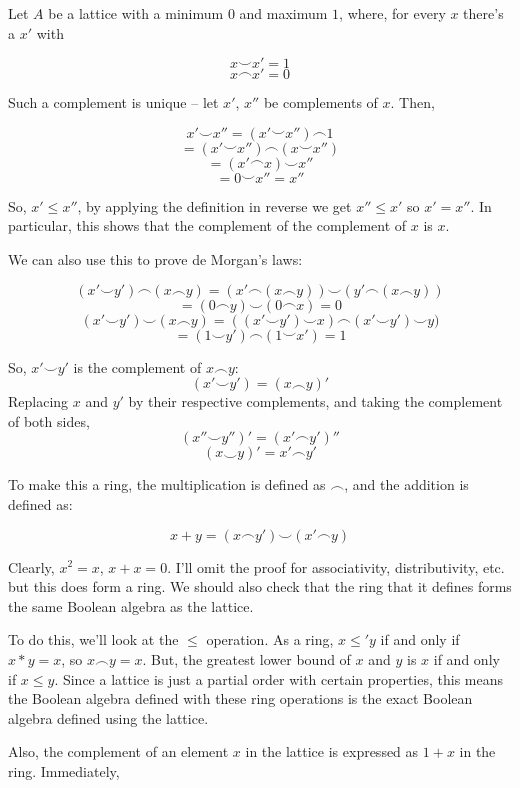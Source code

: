 \documentclass{article}
\begin{document}
      Let $A$ be a lattice with a minimum $0$ and maximum $1$, where, for every
      $x$ there's a $x'$ with

      \[x \smile x' = 1\] \[x \frown x' = 0\]

      Such a complement is unique -- let $x'$, $x''$ be complements of $x$. Then,

      \[x' \smile x'' = (x' \smile  x'') \frown 1\] \[= (x' \smile  x'') \frown (x
      \smile x'')\] \[= (x' \frown x) \smile x''\] \[= 0 \smile x'' = x''\]

      So, $x' \leq x''$, by applying the definition in reverse we get $x'' \leq
      x'$ so $x' = x''$. In particular, this shows that the complement of the
      complement of $x$ is $x$.

      We can also use this to prove de Morgan's laws:

      \[(x' \smile y') \frown (x \frown y) = (x' \frown (x \frown y)) \smile (y'
      \frown (x \frown y))\] \[ = (0 \frown y) \smile (0 \frown x) = 0\]
      \[(x' \smile y') \smile (x \frown y) = ((x' \smile y') \smile x) \frown (x'
      \smile y') \smile y)\] \[ = (1 \smile y') \frown (1 \smile x') = 1\]

      So, $x' \smile y'$ is the complement of $x \frown y$: \[(x' \smile y') = (x
      \frown y)'\] Replacing $x$ and $y'$ by their respective complements, and
      taking the complement of both sides, \[(x'' \smile y'')' = (x' \frown
      y')''\] \[(x \smile y)' = x' \frown y'\]

      To make this a ring, the multiplication is defined as $\frown$, and the
      addition is defined as:

      \[ x + y = (x \frown y') \smile (x' \frown y)\]

      Clearly, $x^2 = x$, $x + x = 0$. I'll omit the proof for associativity,
      distributivity, etc. but this does form a ring. We should also check that
      the ring that it defines forms the same Boolean algebra as the lattice.

      To do this, we'll look at the $\leq$ operation. As a ring, $x \leq' y$ if
      and only if $x*y = x$, so $x \frown y = x$. But, the greatest lower bound of
      $x$ and $y$ is $x$ if and only if $x \leq y$. Since a lattice is just a
      partial order with certain properties, this means the Boolean algebra
      defined with these ring operations is the exact Boolean algebra defined
      using the lattice.

      Also, the complement of an element $x$ in the lattice is expressed as
      $1+x$ in the ring. Immediately,
\end{document}
